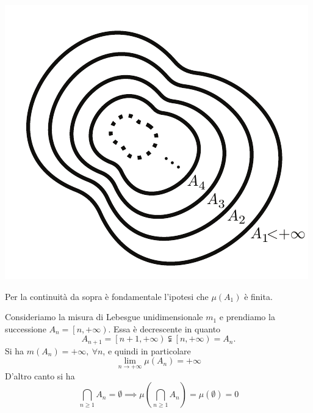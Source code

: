 \begin{property}
\begin{itemize}
	\begin{center}
		\includegraphics[trim=0cm 0cm 0cm 0cm, clip, scale=0.6]{images/misuracontinua2.pdf}
	\end{center}
	\end{itemize}
\end{property}
\begin{attention}
	Per la continuità da sopra è fondamentale l'ipotesi che $\mu\left(A_1\right)$ è finita.
\end{attention}
\begin{examplewt}
	Consideriamo la misura di Lebesgue unidimensionale $m_1$ e prendiamo la successione $A_n=\left[n,+\infty\right)$. Essa è decrescente in quanto
	\begin{equation*}
		A_{n+1}=\left[n+1,+\infty\right)\subsetneqq\left[n,+\infty\right)=A_n.
	\end{equation*}
	Si ha $m\left(A_n\right)=+\infty,\ \forall n$, e quindi in particolare
	\begin{equation*}
		\lim_{n\to+\infty}\mu\left(A_n\right)=+\infty
	\end{equation*}
	D'altro canto si ha
	\begin{equation*}
		\bigcap_{n\geq 1}A_n=\emptyset\implies\mu\left(\bigcap_{n\geq 1}A_n\right)=\mu\left(\emptyset\right)=0
	\end{equation*}
\end{examplewt}
